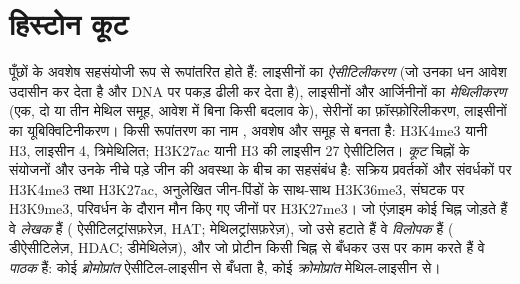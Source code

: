 \section{हिस्टोन कूट}

\begin{definition}[हिस्टोन रूपांतरण]\label{def:b3:chromatin-epigenetics:histone-code}
 पूँछों के अवशेष सहसंयोजी रूप से रूपांतरित होते हैं: लाइसीनों का
\emph{ऐसीटिलीकरण} (जो उनका धन आवेश उदासीन कर देता है और DNA पर पकड़
ढीली कर देता है), लाइसीनों और आर्जिनीनों का \emph{मेथिलीकरण} (एक, दो
या तीन मेथिल समूह, आवेश में बिना किसी बदलाव के), सेरीनों का
फ़ॉस्फ़ोरिलीकरण, लाइसीनों का यूबिक्विटिनीकरण। किसी रूपांतरण का नाम
, अवशेष और समूह से बनता है: H3K4me3 यानी  H3, लाइसीन 4,
त्रिमेथिलित; H3K27ac यानी H3 की लाइसीन 27 ऐसीटिलित। \emph{ कूट}
चिह्नों के संयोजनों और उनके नीचे पड़े जीन की अवस्था के बीच का सहसंबंध
है: सक्रिय प्रवर्तकों और संवर्धकों पर H3K4me3 तथा H3K27ac, अनुलेखित
जीन-पिंडों के साथ-साथ H3K36me3, संघटक  पर H3K9me3,
परिवर्धन के दौरान मौन किए गए जीनों पर H3K27me3। जो एंज़ाइम कोई चिह्न
जोड़ते हैं वे \emph{लेखक} हैं ( ऐसीटिलट्रांसफ़रेज़, HAT;
मेथिलट्रांसफ़रेज़), जो उसे हटाते हैं वे \emph{विलोपक} हैं (
डीऐसीटिलेज़, HDAC; डीमेथिलेज़), और जो प्रोटीन किसी चिह्न से बँधकर उस
पर काम करते हैं वे \emph{पाठक} हैं: कोई \emph{ब्रोमोप्रांत}
ऐसीटिल-लाइसीन से बँधता है, कोई \emph{क्रोमोप्रांत} मेथिल-लाइसीन से।
\end{definition}

